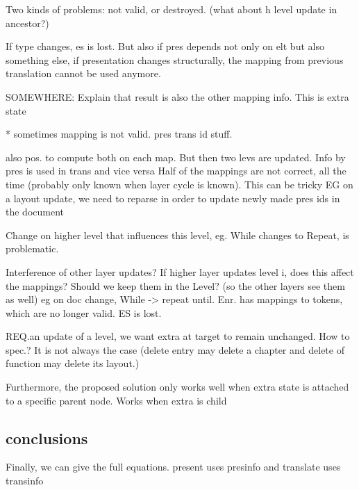 Two kinds of problems: not valid, or destroyed.     (what about h level update in ancestor?)

If type changes, es is lost. But also if pres depends not only on elt but also something else, if presentation changes structurally, the mapping from previous translation cannot be used anymore.

SOMEWHERE: Explain that result is also the other mapping info. This is extra state

* sometimes mapping is not valid. pres trans id stuff.

also pos. to compute both on each map. But then two levs are updated. 
Info by pres is used in trans and vice versa
Half of the mappings are not correct, all the time (probably only known when layer cycle is known). This can be tricky
EG on a layout update, we need to reparse in order to update newly made pres ids in the document

Change on higher level that influences this level, eg. While changes to Repeat, is problematic.

Interference of other layer updates? If higher layer updates level i, does this affect the mappings? Should we keep them in the Level? (so the other layers see them as well) eg on doc change, While -> repeat until. Enr. has mappings to tokens, which are no longer valid. ES is lost. 


REQ.an update of a level, we want extra at target to remain unchanged. How to spec.? It is not always the case (delete entry may delete a chapter and delete of function may delete its layout.) 


Furthermore, the proposed solution only works well when extra state is attached to a specific parent node. Works when extra is child


\subsection{conclusions}
Finally, we can give the full equations. present uses presinfo and translate uses transinfo


